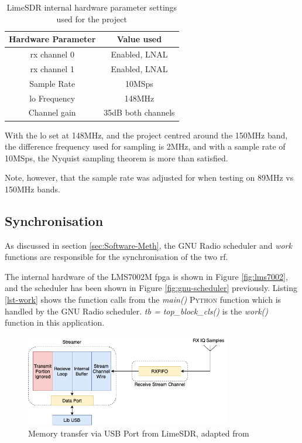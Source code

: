\documentclass[class=report,11pt,crop=false]{standalone}
\begin{document}
\begin{table}[h]
    \centering
    \begin{tabular}{c|c}
        \textbf{Hardware Parameter} & \textbf{Value used}  \\
        \hline
        \gls{rx} channel 0  &  Enabled, LNAL\\
        \gls{rx} channel 1  & Enabled, LNAL\\
        Sample Rate & 10MSps\\
        \gls{lo} Frequency & 148MHz \\
        Channel gain & 35dB both channels\\
    \end{tabular}
    \caption{LimeSDR internal hardware parameter settings used for the project}
    \label{tab:sdrsetting}
\end{table}
With the \gls{lo} set at 148MHz, and the project centred around the 150MHz band, the difference frequency used for sampling is 2MHz, and with a sample rate of 10MSps, the Nyquist sampling theorem is more than satisfied. 

Note, however, that the sample rate was adjusted for when testing on 89MHz vs 150MHz bands.

\subsection{Synchronisation}
As discussed in section \ref{sec:Software-Meth}, the GNU Radio scheduler and \emph{work} functions are responsible for the synchronisation of the two \gls{rf}. 

The internal hardware of the LMS7002M \gls{fpga} is shown in Figure \ref{fig:lms7002}, and the scheduler has been shown in Figure \ref{fig:gnu-scheduler} previously. Listing \ref{lst-work} shows the function calls from the \emph{main()} \textsc{Python} function which is handled by the GNU Radio scheduler. \emph{tb = top\_block\_cls()} is the \emph{work()} function in this application.

\begin{figure}[h]
    \centering
    \includegraphics[width=0.8\textwidth]{Images/diagrams/limesdr-mem.png}
    \caption{Memory transfer via USB Port from LimeSDR, adapted from \cite{gnu-delays}}
    \label{fig:lime-mem}
\end{figure}
\end{document}
